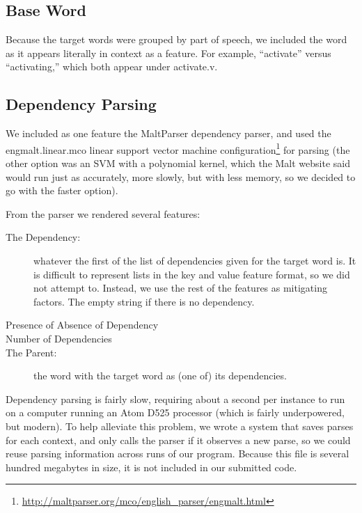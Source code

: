 \documentclass{article}
\begin{document}
\subsection{Base Word}

Because the target words were grouped by part of speech, we included the word
as it appears literally in context as a feature.  For example, ``activate''
versus ``activating,'' which both appear under activate.v.

\subsection{Dependency Parsing}

We included as one feature the MaltParser dependency parser, and used the
engmalt.linear.mco linear support vector machine
configuration\footnote{\url{http://maltparser.org/mco/english_parser/engmalt.html}}
for parsing (the other option was an SVM with a polynomial kernel, which the
Malt website said would run just as accurately, more slowly, but with less
memory, so we decided to go with the faster option).

From the parser we rendered several features:

\begin{description}

\item[The Dependency:] whatever the first of the list of dependencies given for
the target word is.  It is difficult to represent lists in the key and value
feature format, so we did not attempt to.  Instead, we use the rest of the
features as mitigating factors.  The empty string if there is no dependency.

\item[Presence of Absence of Dependency]

\item[Number of Dependencies]

\item[The Parent:] the word with the target word as (one of) its dependencies.

\end{description}

Dependency parsing is fairly slow, requiring about a second per instance to run
on a computer running an Atom D525 processor (which is fairly underpowered, but
modern).  To help alleviate this problem, we wrote a system that saves parses
for each context, and only calls the parser if it observes a new parse, so we
could reuse parsing information across runs of our program.  Because this file
is several hundred megabytes in size, it is not included in our submitted code.
\end{document}
